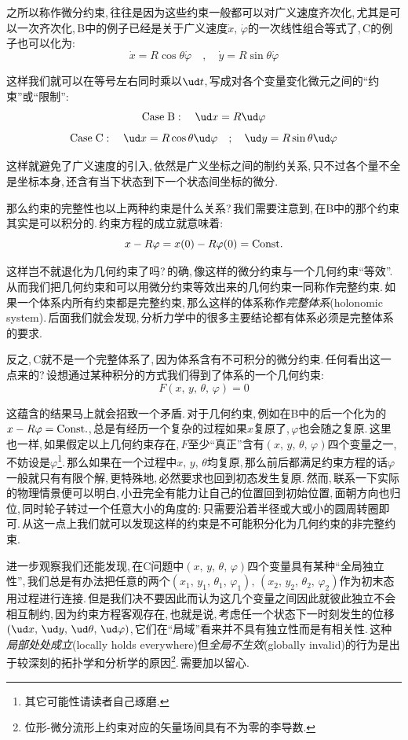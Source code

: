 之所以称作微分约束,\,往往是因为这些约束一般都可以对广义速度齐次化,\,尤其是可以一次齐次化,\,B中的例子已经是关于广义速度$\dot{x},\,\dot{\varphi}$的一次线性组合等式了,\,C的例子也可以化为:
\[\dot{x}=R\cos\theta\dot{\varphi}\quad,\quad \dot{y}=R\sin\theta\dot{\varphi}\]

这样我们就可以在等号左右同时乘以$\ud t$,\,写成对各个变量变化微元之间的``约束''或``限制'':
\[{\rm Case\; B}:\quad \ud x=R\ud \varphi\]
\[{\rm Case\; C}:\quad \ud x=R\cos\theta\ud \varphi\quad;\quad \ud y=R\sin\theta\ud \varphi\]

这样就避免了广义速度的引入,\,依然是广义坐标之间的制约关系,\,只不过各个量不全是坐标本身,\,还含有当下状态到下一个状态间坐标的微分.

那么约束的完整性也以上两种约束是什么关系?\,我们需要注意到,\,在B中的那个约束其实是可以积分的.\,约束方程的成立就意味着:
\[x-R\varphi=x(0)-R\varphi(0)={\rm Const.}\]

这样岂不就退化为几何约束了吗?\,的确,\,像这样的微分约束与一个几何约束``等效''.\,从而我们把几何约束和可以用微分约束等效出来的几何约束一同称作完整约束.\,如果一个体系内所有约束都是完整约束,\,那么这样的体系称作\emph{完整体系}(holonomic system).\,后面我们就会发现,\,分析力学中的很多主要结论都有体系必须是完整体系的要求.

反之,\,C就不是一个完整体系了,\,因为体系含有不可积分的微分约束.\,任何看出这一点来的?\,设想通过某种积分的方式我们得到了体系的一个几何约束:
\[F(x,\,y,\,\theta,\,\varphi)=0\]

这蕴含的结果马上就会招致一个矛盾.\,对于几何约束,\,例如在B中的后一个化为的$x-R\varphi={\rm Const.}$,\,总是有经历一个复杂的过程如果$x$复原了,\,$\varphi$也会随之复原.\,这里也一样,\,如果假定以上几何约束存在,\,$F$至少``真正''含有$(x,\,y,\,\theta,\,\varphi)$四个变量之一,\,不妨设是$\varphi$\footnote{其它可能性请读者自己琢磨.}.\,那么如果在一个过程中$x,\,y,\,\theta$均复原,\,那么前后都满足约束方程的话$\varphi$一般就只有有限个解,\,更特殊地,\,必然要求也回到初态发生复原.\,然而,\,联系一下实际的物理情景便可以明白,\,小丑完全有能力让自己的位置回到初始位置,\,面朝方向也归位,\,同时轮子转过一个任意大小的角度的:\,只需要沿着半径或大或小的圆周转圈即可.\,从这一点上我们就可以发现这样的约束是不可能积分化为几何约束的非完整约束.

进一步观察我们还能发现,\,在C问题中$(x,\,y,\,\theta,\,\varphi)$四个变量具有某种``全局独立性'',\,我们总是有办法把任意的两个$(x_1,\,y_1,\,\theta_1,\,\varphi_1),\,(x_2,\,y_2,\,\theta_2,\,\varphi_2)$作为初末态用过程进行连接.\,但是我们决不要因此而认为这几个变量之间因此就彼此独立不会相互制约,\,因为约束方程客观存在,\,也就是说,\,考虑任一个状态下一时刻发生的位移$(\ud x,\,\ud y,\,\ud \theta,\,\ud \varphi)$,\,它们在``局域''看来并不具有独立性而是有相关性.\,这种\emph{局部处处成立}(locally holds everywhere)但\emph{全局不生效}(globally invalid)的行为是出于较深刻的拓扑学和分析学的原因\footnote{位形-微分流形上约束对应的矢量场间具有不为零的李导数.}.\,需要加以留心.

